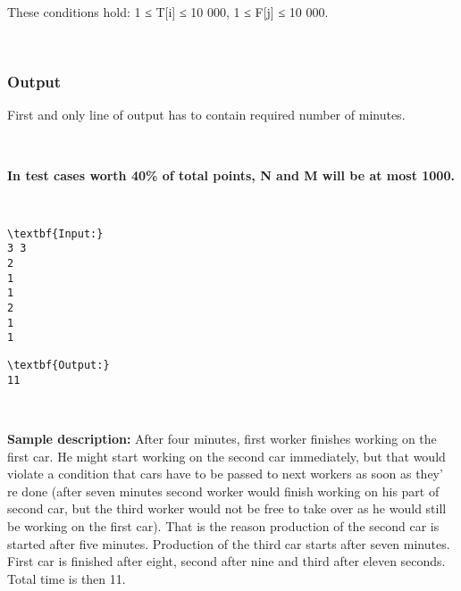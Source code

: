 These conditions hold: 1 ≤ T[i] ≤ 10 000, 1 ≤ F[j] ≤ 10 000.

 

\subsubsection{Output}

First and only line of output has to contain required number of minutes.

 

\textbf{In test cases worth 40\% of total points, N and M will be at most 1000. }

 
\begin{verbatim}
\textbf{Input:}
3 3
2
1
1
2
1
1
\end{verbatim}
\begin{verbatim}
\textbf{Output:}
11\end{verbatim}

 

\textbf{Sample description: } After four minutes, first worker finishes working on the first car. He might start working on the second car immediately, but that would violate a condition that cars have to be passed to next workers as soon as they' re done (after seven minutes second worker would finish working on his part of second car, but the third worker would not be free to take over as he would still be working on the first car). That is the reason production of the second car is started after five minutes. Production of the third car starts after seven minutes. First car is finished after eight, second after nine and third after eleven seconds. Total time is then 11.